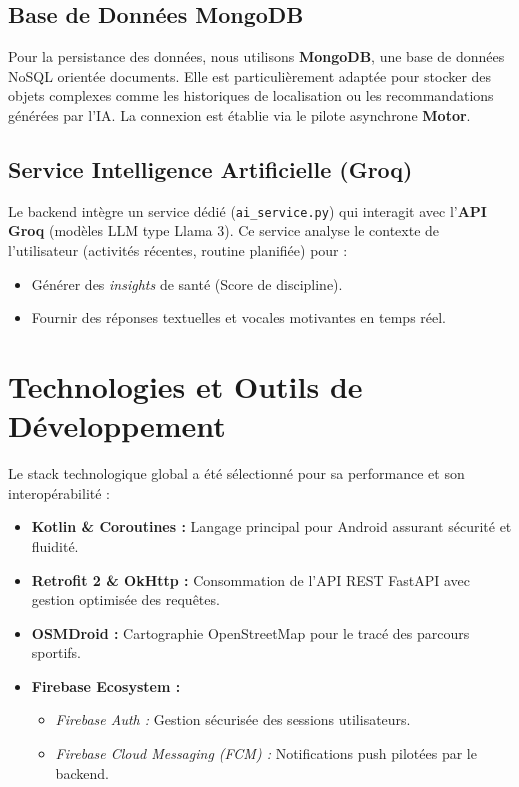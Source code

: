 \documentclass[12pt,a4paper,oneside]{report}
\begin{document}
\subsection{Base de Données MongoDB}
Pour la persistance des données, nous utilisons \textbf{MongoDB}, une base de données NoSQL orientée documents. Elle est particulièrement adaptée pour stocker des objets complexes comme les historiques de localisation ou les recommandations générées par l'IA. La connexion est établie via le pilote asynchrone \textbf{Motor}.

\subsection{Service Intelligence Artificielle (Groq)}
Le backend intègre un service dédié (\texttt{ai\_service.py}) qui interagit avec l'\textbf{API Groq} (modèles LLM type Llama 3). Ce service analyse le contexte de l'utilisateur (activités récentes, routine planifiée) pour :
\begin{itemize}
    \item Générer des \textit{insights} de santé (Score de discipline).
    \item Fournir des réponses textuelles et vocales motivantes en temps réel.
\end{itemize}

\section{Technologies et Outils de Développement}

Le stack technologique global a été sélectionné pour sa performance et son interopérabilité :

\begin{itemize}
    \item \textbf{Kotlin \& Coroutines :} Langage principal pour Android assurant sécurité et fluidité.
    \item \textbf{Retrofit 2 \& OkHttp :} Consommation de l'API REST FastAPI avec gestion optimisée des requêtes.
    \item \textbf{OSMDroid :} Cartographie OpenStreetMap pour le tracé des parcours sportifs.
    \item \textbf{Firebase Ecosystem :}
    \begin{itemize}
        \item \textit{Firebase Auth :} Gestion sécurisée des sessions utilisateurs.
        \item \textit{Firebase Cloud Messaging (FCM) :} Notifications push pilotées par le backend.
    \end{itemize}
\end{itemize}
\end{document}
